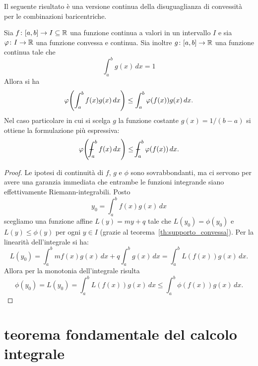 Il seguente risultato è una versione continua della disuguaglianza di convessità 
per le combinazioni baricentriche.
%
\begin{theorem}
  \label{th:jensen}%
Sia $f\colon[a,b]\to I\subseteq {\mathbb R}$ una funzione continua a valori 
in un intervallo $I$ e sia $\varphi\colon I \to {\mathbb R}$ una funzione convessa e continua.
Sia inoltre $g\colon [a,b]\to {\mathbb R}$ una funzione continua tale che 
\[
    \int_a^b g(x)\, dx = 1
\]
Allora si ha 
  \[
  \varphi{\left( \int_a^b f(x) g(x) \, dx \right)} \le \int_a^b \varphi(f(x)) g(x)\, dx.
  \]
Nel caso particolare in cui si scelga $g$ la funzione costante $g(x)=1/(b-a)$ si ottiene 
la formulazione più espressiva:
\[
  \phi\enclose{\dashint_a^b f(x)\, dx} \le \dashint_a^b \phi(f(x))\, dx.
\]
\end{theorem}
%
\begin{proof}
Le ipotesi di continuità di $f$, $g$ e $\phi$ sono sovrabbondanti, ma ci servono 
per avere una garanzia immediata che entrambe le funzioni integrande
siano effettivamente Riemann-integrabili.
Posto 
\[
  y_0 = \int_a^b f(x) g(x)\, dx 
\]
scegliamo una funzione affine $L(y) = my + q$ tale che $L(y_0)=\phi(y_0)$ 
e $L(y)\le \phi(y)$ per ogni $y\in I$ (grazie al teorema~\ref{th:supporto_convessa}).
Per la linearità dell'integrale si ha: 
\[
  L(y_0)
  = \int_a^b mf(x)g(x)\, dx + q \int_a^b g(x)\, dx
  = \int_a^b L(f(x)) g(x)\, dx.
\]
Allora per la monotonia dell'integrale risulta
\[
  \phi(y_0) = L(y_0) = \int_a^b L(f(x)) g(x)\, dx \le \int_a^b \phi(f(x)) g(x)\, dx.
\]
\end{proof}

\section{teorema fondamentale del calcolo integrale}

